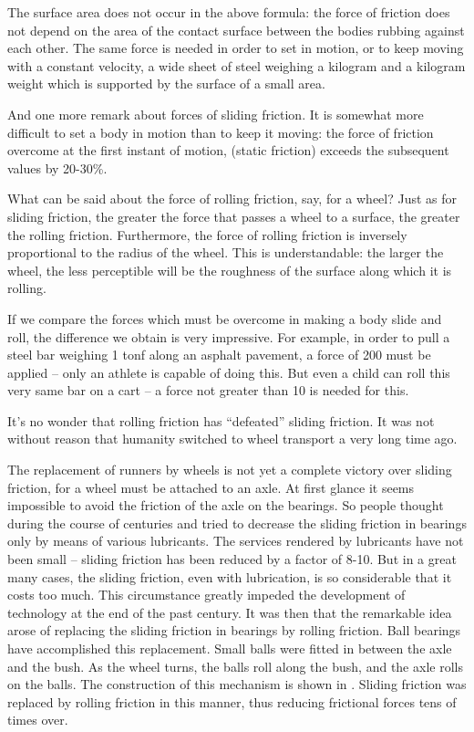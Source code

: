 \clearpage

The surface area does not occur in the above formula: the force of friction does not depend on the area of the contact surface between the bodies rubbing against each other. The same force is needed in order to set in motion, or to keep moving with a constant velocity, a wide sheet of steel weighing a kilogram and a kilogram weight which is supported by the surface of a small area.

And one more remark about forces of sliding friction. It is somewhat more difficult to set a body in motion than to keep it moving: the force of friction overcome at the first instant of motion, (static friction) exceeds the subsequent values by 20-30\%.

What can be said about the force of rolling friction, say, for a wheel? Just as for sliding friction, the greater the force that passes a wheel to a surface, the greater the rolling friction. Furthermore, the force of rolling friction is inversely proportional to the radius of the wheel. This is understandable: the larger the wheel, the less perceptible will be the roughness of the surface along which it is rolling.

If we compare the forces which must be overcome in making a body slide and roll, the difference we obtain is very impressive. For example, in order to pull a steel bar weighing 1 tonf along an asphalt pavement, a force of \SI{200}{\kgf} must be applied -- only an athlete is capable of doing this. But even a child can roll this very same bar on a cart -- a force not greater than \SI{10}{\kgf} is needed for this.

It’s no wonder that rolling friction has ``defeated'' sliding friction. It was not without reason that humanity switched to wheel transport a very long time ago.

The replacement of runners by wheels is not yet a com­plete victory over sliding friction, for a wheel must be attached to an axle. At first glance it seems impossible to avoid the friction of the axle on the bearings. So peo­ple thought during the course of centuries and tried to decrease the sliding friction in bearings only by means of various lubricants. The services rendered by lubricants have not been small -- sliding friction has been reduced by a factor of 8-10. But in a great many cases, the slid­ing friction, even with lubrication, is so considerable that it costs too much. This circumstance greatly impeded the development of technology at the end of the past century. It was then that the remarkable idea arose of replacing the sliding friction in bearings by rolling friction. Ball bearings have accomplished this replacement. Small balls were fitted in between the axle and the bush. As the wheel turns, the balls roll along the bush, and the axle rolls on the balls. The construction of this mechanism is shown in . Sliding friction was replaced by rolling friction in this manner, thus reducing frictional forces tens of times over.

